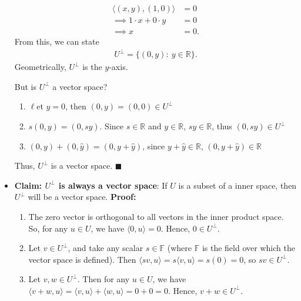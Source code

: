 \documentclass{report}
\begin{document}
\begin{itemize}
            \begin{align*}
                \langle(x,y), (1,0)\rangle &= 0 \\
                \implies 1 \cdot x + 0 \cdot y &= 0 \\
                \implies x &= 0 
            .\end{align*}
            \bigbreak \noindent 
            From this, we can state
            \begin{align*}
                U^{\perp} = \{(0,y):\ y \in \mathbb{R}\} 
            .\end{align*}
            \bigbreak \noindent 
            Geometrically, $U^{\perp}$ is the $y$-axis.
            \bigbreak \noindent 
            \begin{figure}[ht]
                \centering
                \label{fig:geom2}
            \end{figure}
            \bigbreak \noindent 
            But is $U^{\perp}$ a vector space?
            \begin{enumerate}
                \item $\ell$et $y=0$, then $(0,y) = (0,0) \in U^{\perp}$
                \item $s(0,y) = (0,sy)$. Since $s\in \mathbb{R}$ and $y\in \mathbb{R}$, $sy \in \mathbb{R}$, thus $(0,sy) \in U^{\perp}$
                \item $(0,y) + (0,\hat{y})  = (0,y + \hat{y})$, since $y + \hat{y} \in \mathbb{R}$, $(0,y+\hat{y}) \in \mathbb{R}$
            \end{enumerate}
            Thus, $U^{\perp}$ is a vector space. $\blacksquare$
        \item \textbf{Claim: $U^{\perp}$ is always a vector space}: If $U$ is a subset of a inner space, then $U^{\perp}$ will be a vector space.
            \bigbreak \noindent 
            \textbf{Proof:}
            \begin{enumerate}
                \item The zero vector is orthogonal to all vectors in the inner product space. So, for any $u \in U$, we have $\langle 0, u \rangle = 0$. Hence, $0 \in U^{\perp}$.
                \item Let $v \in U^{\perp}$, and take any scalar $s \in \mathbb{F}$ (where $\mathbb{F}$ is the field over which the vector space is defined). Then $\langle sv, u \rangle = s\langle v, u \rangle = s(0) = 0$, so $sv \in U^{\perp}$.
                \item Let $v, w \in U^{\perp}$. Then for any $u \in U$, we have $\langle v + w, u \rangle = \langle v, u \rangle + \langle w, u \rangle = 0 + 0 = 0$. Hence, $v + w \in U^{\perp}$.

\end{enumerate}
\end{itemize}
\end{document}
